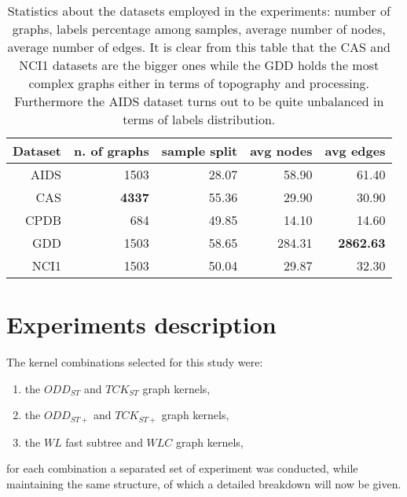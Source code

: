     \begin{table}[ht]
        \centering
        \begin{tabular}{|r|r|r|r|r|}
            \hline
            Dataset & n. of graphs & sample split & avg nodes & avg edges \\ \hline
            AIDS    & 1503         & 28.07        & 58.90     & 61.40     \\ \hline      
            CAS     & \textbf{4337} & 55.36        & 29.90     & 30.90     \\ \hline      
            CPDB    &  684         & 49.85        & 14.10     & 14.60     \\ \hline      
            GDD     & 1503         & 58.65        & 284.31    & \textbf{2862.63}   \\ \hline      
            NCI1    & 1503         & 50.04        & 29.87     & 32.30     \\ \hline      
        \end{tabular}
        \caption{Statistics about the datasets employed in the experiments: number
        of graphs, labels percentage among samples, average number of nodes, average
        number of edges. It is clear from this table that the CAS and NCI1 datasets
        are the bigger ones while the GDD holds the most complex graphs either in
        terms of topography and processing. Furthermore the AIDS dataset turns out
        to be quite unbalanced in terms of labels distribution.}
        \label{table:datasets}
    \end{table}


\section{Experiments description}

The kernel combinations selected for this study were:
\begin{enumerate}
    \item the $ODD_{ST}$ and $TCK_{ST}$ graph kernels,
    \item the $ODD_{ST+}$ and $TCK_{ST+}$ graph kernels,
    \item the $WL$ fast subtree and $WLC$ graph kernels,
\end{enumerate}

for each combination a separated set of experiment was conducted, while maintaining
the same structure, of which a detailed breakdown will now be given.


